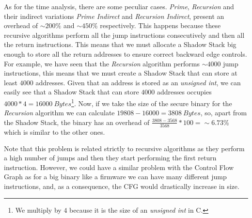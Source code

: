 As for the time analysis, there are some peculiar cases. \textit{Prime}, \textit{Recursion}
and their indirect variations \textit{Prime Indirect} and \textit{Recursion
Indirect}, present an overhead of $\sim 200\%$ and $\sim 450\%$ respectively.
This happens because these recursive algorithms perform all the jump
instructions consecutively and then all the return instructions. This means that
we must allocate a Shadow Stack big enough to store all the return addresses to ensure
correct backward edge controls. For example, we have seen that the \textit{Recursion}
algorithm performs $\sim 4000$ jump instructions, this means that we must create
a Shadow Stack that can store at least $4000$ addresses. Given that an address
is stored as an \textit{unsigned int}, we can easily see that a Shadow Stack
that can store $4000$ addresses occupies $4000*4 = 16000 \ \textit{Bytes}$\footnote{We
multiply by $4$ because it is the size of an \textit{unsigned int} in C.}. Now, if
we take the size of the secure binary for the \textit{Recursion} algorithm we
can calculate $19808 - 16000 = 380 8 \ \textit{Bytes}$, so, apart from the
Shadow Stack, the binary has an overhead of $\frac{3808-3568}{3568}*100 = \sim 6.
73\%$ which is similar to the other ones.

Note that this problem is related strictly to recursive algorithms as they perform
a high number of jumps and then they start performing the first return instruction.
However, we could have a similar problem with the Control Flow Graph as for a big
binary like a firmware we can have many different jump instructions, and, as a consequence,
the CFG would drastically increase in size.

